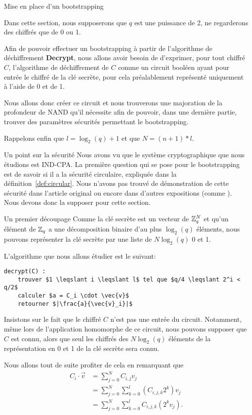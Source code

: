 \begin{section}{Mise en place d'un bootstrapping}

Dans cette section, nous supposerons que $q$ est une puissance de 2, ne regarderons des chiffrés que de 0 ou 1.

Afin de pouvoir effectuer un bootstrapping à partir de l'algorithme de déchiffrement \textbf{Decrypt}, nous
allons avoir besoin de d'exprimer, pour tout chiffré $C$, l'algorithme de déchiffrement de $C$ comme 
un circuit booléen ayant pour entrée le chiffré de la clé secrète, pour cela préalablement représenté
uniquement à l'aide de 0 et de 1.

Nous allons donc créer ce circuit et nous trouverons une majoration de la profondeur de NAND qu'il nécessite afin de pouvoir, dans une dernière partie, trouver des paramètres sécurités permettant le bootstrapping.

Rappelons enfin que $l = \log_2(q)+1$ et que $N = (n+1)*l$.
\begin{subsection}{Un point sur la sécurité}
Nous avons vu que le système cryptographique que nous étudions est IND-CPA. 
La première question qui se pose pour le bootstrapping est de savoir si il a la sécurité
circulaire, expliquée dans la définition~\ref{def:circular}.  Nous n'avons pas trouvé de démonstration de cette sécurité
dans l'article original \cite{EPRINT:GenSahWat13} ou encore dans d'autres expositions (comme \cite{halevi}). Nous devons
donc la supposer pour cette section.
\end{subsection}
\begin{subsection}{Un premier découpage}
Comme la clé secrète est un vecteur de $\mathbb{Z}_q^N$ et qu'un élément de $\mathbb{Z}_q$ a une décomposition binaire d'au plus $\log_2(q)$ éléments, nous pouvons représenter la clé secrète par une liste de $N\log_2(q)$ 0 et 1.

L'algorithme que nous allons étudier est le suivant:
\begin{lstlisting}[label={lst:decoupage}]
decrypt(C) :
	trouver $1 \leqslant i \leqslant l$ tel que $q/4 \leqslant 2^i < q/2$
	calculer $a = C_i \cdot \vec{v}$
	retourner $|\frac{a}{\vec{v}_i}|$
\end{lstlisting}
Insistons sur le fait que le chiffré $C$ n'est pas une entrée du circuit. Notamment, même lors de 
l'application homomorphe de ce circuit, nous pouvons supposer que $C$ est connu, alors que
seul les chiffrés des $N\log_2(q)$ éléments de la représentation en 0 et 1 de la clé secrète sera connu. 

Nous allons tout de suite profiter de cela en remarquant que
\begin{align*} 
	C_i \cdot \vec{v} &= \sum_{j=0}^N C_{i,j} v_j \\
	&= \sum_{j=0}^N \sum_{k=0}^l \left( C_{i,j,k} 2^k \right) v_j \\
	&= \sum_{j=0}^N \sum_{k=0}^l C_{i,j,k} (2^k v_j).
\end{align*}


\end{subsection}
\end{section}
